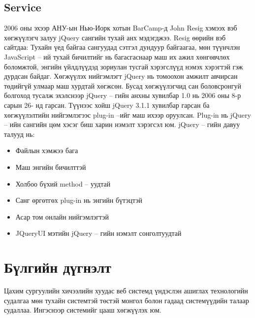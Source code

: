 \subsection{Service}
\hspace{1cm}2006 оны эхээр АНУ-ын Нью-Иорк хотын BarCamp-д John Resig хэмээх вэб хөгжүүлэгч залуу jQuery сангийн тухай анх мэдэгджээ. Resig өөрийн вэб сайтдаа: Тухайн үед байгаа сангуудад сэтгэл дундуур байгаагаа, мөн түүнчлэн JavaScript – ий тухай бичилтийг нь багасгаснаар маш их ажил хөнгөвчлөх боломжтой, энгийн үйлдлүүдэд зориулан тусгай хэрэгслүүд нэмэх хэрэгтэй гэж дурдсан байдаг.
Хөгжүүлэх нийгэмлэгт jQuery нь томоохон амжилт авчирсан төдийгүй улмаар маш хурдтай хөгжсөн. Бусад хөгжүүлэгчид сан боловсронгуй болгоход тусалж эхэлснээр jQuery – гийн анхны хувилбар 1.0 нь 2006 оны 8-р сарын 26- нд гарсан.
Түүнээс хойш jQuery 3.1.1 хувилбар гарсан ба хөгжүүлэлтийн нийгэмлэгээс plug-in –ийг маш ихээр оруулсан. Plug-in нь jQuery – ийн сангийн цөм хэсэг биш харин нэмэлт хэрэгсэл юм. 
jQuery – гийн давуу талууд нь:
\begin{itemize}
\item Файлын хэмжээ бага
\item Маш энгийн бичилттэй
\item Холбоо бүхий method – уудтай
\item Санг өргөтгөх plug-in нь энгийн бүтэцтэй
\item Асар том онлайн нийгэмлэгтэй
\item JQueryUI мэтийн jQuery – гийн нэмэлт сонголтуудтай
\end{itemize}
\section{Бүлгийн дүгнэлт}
\hspace{1cm}Цахим сургуулийн хичээлийн хуудас веб системд үндэслэн ашиглах технологийн судалгаа мөн тухайн системтэй төстэй монгол болон гадаад системүүдийн талаар судаллаа. Ингэснээр системийг цааш хөгжүүлэх юм.
